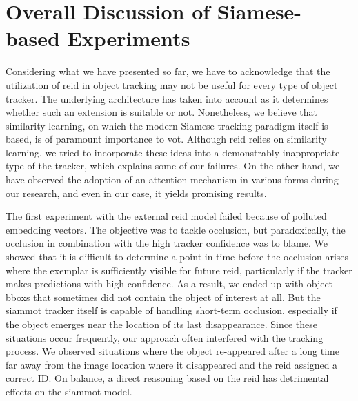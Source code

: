 \section{Overall Discussion of Siamese-based Experiments}
\label{sec:ExperimentsDisucssion}

Considering what we have presented so far, we have to acknowledge that the utilization of \gls{reid} in object tracking may not be useful for every type of object tracker. The underlying architecture has taken into account as it determines whether such an extension is suitable or not. Nonetheless, we believe that similarity learning, on which the modern Siamese tracking paradigm itself is based, is of paramount importance to \gls{vot}. Although \gls{reid} relies on similarity learning, we tried to incorporate these ideas into a demonstrably inappropriate type of the tracker, which explains some of our failures. On the other hand, we have observed the adoption of an attention mechanism in various forms during our research, and even in our case, it yields promising results.

The first experiment with the external \gls{reid} model failed because of polluted embedding vectors. The objective was to tackle occlusion, but paradoxically, the occlusion in combination with the high tracker confidence was to blame. We showed that it is difficult to determine a point in time before the occlusion arises where the exemplar is sufficiently visible for future \gls{reid}, particularly if the tracker makes predictions with high confidence. As a result, we ended up with object \glspl{bbox} that sometimes did not contain the object of interest at all. But the \gls{siammot} tracker itself is capable of handling short-term occlusion, especially if the object emerges near the location of its last disappearance. Since these situations occur frequently, our approach often interfered with the tracking process. We observed situations where the object re-appeared after a long time far away from the image location where it disappeared and the \gls{reid} assigned a correct ID. On balance, a direct reasoning based on the \gls{reid} has detrimental effects on the \gls{siammot} model.

